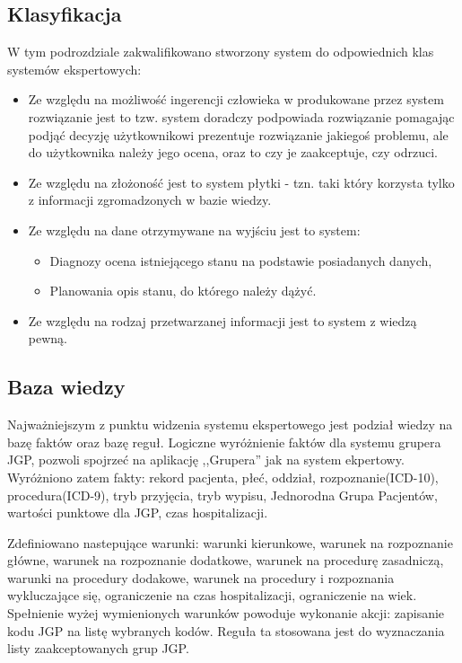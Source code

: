 \subsection{Klasyfikacja}
\label{sec:klasyfikacjaSystemuEkspertowego}
W tym podrozdziale zakwalifikowano stworzony system do odpowiednich klas systemów ekspertowych:
\begin{itemize}
 \item Ze względu na możliwość ingerencji człowieka w produkowane przez system rozwiązanie jest to tzw. system doradczy \textendash{} podpowiada rozwiązanie pomagając podjąć decyzję użytkownikowi \textendash{} prezentuje rozwiązanie jakiegoś problemu, ale do użytkownika należy jego ocena, oraz to czy je zaakceptuje, czy odrzuci\cite{goluchowski_eskpertowe}.
 \item Ze względu na złożoność jest to system płytki - tzn. taki który korzysta tylko z informacji zgromadzonych w bazie wiedzy\cite{goluchowski_eskpertowe}.
 \item Ze względu na dane otrzymywane na wyjściu\cite{mulawka_ekspertowe} jest to system:
   \begin{itemize}
    \item Diagnozy \textendash{} ocena istniejącego stanu na podstawie posiadanych danych,
    \item Planowania \textendash{} opis stanu, do którego należy dążyć.
   \end{itemize}
 \item Ze względu na rodzaj przetwarzanej informacji jest to system z wiedzą pewną\cite{mulawka_ekspertowe}.
\end{itemize}

\subsection{Baza wiedzy}
\label{sec:bazaWiedzy}
Najważniejszym z punktu widzenia systemu ekspertowego jest podział wiedzy na bazę faktów oraz bazę reguł\cite{zielonogorski_ekspertowe}. Logiczne wyróżnienie faktów dla systemu grupera JGP, pozwoli spojrzeć na aplikację ,,Grupera'' jak na system ekpertowy. Wyróżniono zatem fakty: rekord pacjenta, płeć, oddział, rozpoznanie(ICD-10), procedura(ICD-9), tryb przyjęcia, tryb wypisu, Jednorodna Grupa Pacjentów, wartości punktowe dla JGP, czas hospitalizacji.

Zdefiniowano nastepujące warunki: warunki kierunkowe, warunek na rozpoznanie główne, warunek na rozpoznanie dodatkowe, warunek na procedurę zasadniczą, warunki na procedury dodakowe, warunek na procedury i rozpoznania wykluczające się, ograniczenie na czas hospitalizacji, ograniczenie na wiek.
Spełnienie wyżej wymienionych warunków powoduje wykonanie akcji: zapisanie kodu JGP na listę wybranych kodów. Reguła ta stosowana jest do wyznaczania listy zaakceptowanych grup JGP.

